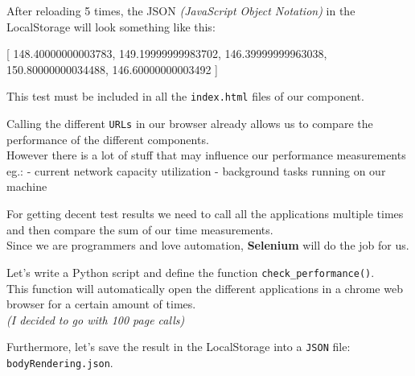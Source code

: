 \documentclass[11pt]{article}
\newenvironment{Shaded}{}{}
\newcommand{\FloatTok}[1]{\textcolor[rgb]{0.25,0.63,0.44}{{#1}}}
\newcommand{\OtherTok}[1]{\textcolor[rgb]{0.00,0.44,0.13}{{#1}}}
\begin{document}
    After reloading 5 times, the JSON \emph{(JavaScript Object Notation)} in
the LocalStorage will look something like this:

\begin{Shaded}
\begin{Highlighting}[]
\OtherTok{[}
    \FloatTok{148.40000000003783}\OtherTok{,}
    \FloatTok{149.19999999983702}\OtherTok{,}
    \FloatTok{146.39999999963038}\OtherTok{,}
    \FloatTok{150.80000000034488}\OtherTok{,}
    \FloatTok{146.60000000003492}
\OtherTok{]}
\end{Highlighting}
\end{Shaded}

This test must be included in all the \texttt{index.html} files of our
component.

    Calling the different \texttt{URLs} in our browser already allows us to
compare the performance of the different components.\\
However there is a lot of stuff that may influence our performance
measurements eg.: - current network capacity utilization - background
tasks running on our machine

For getting decent test results we need to call all the applications
multiple times and then compare the sum of our time measurements.\\
Since we are programmers and love automation, \textbf{Selenium} will do
the job for us.

Let's write a Python script and define the function
\texttt{check\_performance()}.\\
This function will automatically open the different applications in a
chrome web browser for a certain amount of times.\\
\emph{(I decided to go with 100 page calls)}

Furthermore, let's save the result in the LocalStorage into a
\texttt{JSON} file: \texttt{bodyRendering.json}.
\end{document}
